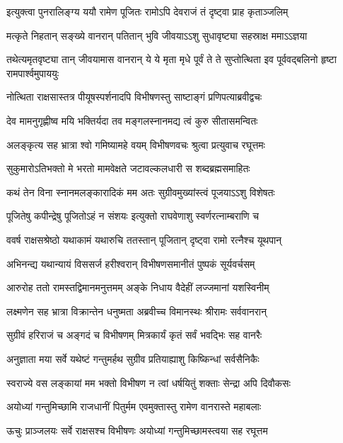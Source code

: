 \twolineshloka
{इत्युक्त्वा पुनरालिङ्ग्य ययौ रामेण पूजितः}
{रामोऽपि देवराजं तं दृष्ट्वा प्राह कृताञ्जलिम्} %

\twolineshloka
{मत्कृते निहतान् सङ्ख्ये वानरान् पतितान् भुवि}
{जीवयाऽऽशु सुधावृष्ट्या सहस्राक्ष ममाऽऽज्ञया} %

\threelineshloka
{तथेत्यमृतवृष्ट्या तान् जीवयामास वानरान्}
{ये ये मृता मृधे पूर्वं ते ते सुप्तोत्थिता इव}
{पूर्ववद्बलिनो हृष्टा रामपार्श्वमुपाययुः} %

\twolineshloka
{नोत्थिता राक्षसास्तत्र पीयूषस्पर्शनादपि}
{विभीषणस्तु साष्टाङ्गं प्रणिपत्याब्रवीद्वचः} %

\twolineshloka
{देव मामनुगृह्णीष्व मयि भक्तिर्यदा तव}
{मङ्गलस्नानमद्य त्वं कुरु सीतासमन्वितः} %

\twolineshloka
{अलङ्कृत्य सह भ्रात्रा श्वो गमिष्यामहे वयम्}
{विभीषणवचः श्रुत्वा प्रत्युवाच रघूत्तमः} %

\twolineshloka
{सुकुमारोऽतिभक्तो मे भरतो मामवेक्षते}
{जटावल्कलधारी स शब्दब्रह्मसमाहितः} %

\twolineshloka
{कथं तेन विना स्नानमलङ्कारादिकं मम}
{अतः सुग्रीवमुख्यांस्त्वं पूजयाऽऽशु विशेषतः} %

\twolineshloka
{पूजितेषु कपीन्द्रेषु पूजितोऽहं न संशयः}
{इत्युक्तो राघवेणाशु स्वर्णरत्नाम्बराणि च} %

\twolineshloka
{ववर्ष राक्षसश्रेष्ठो यथाकामं यथारुचि}
{ततस्तान् पूजितान् दृष्ट्वा रामो रत्नैश्च यूथपान्} %

\twolineshloka
{अभिनन्द्य यथान्यायं विससर्ज हरीश्वरान्}
{विभीषणसमानीतं पुष्पकं सूर्यवर्चसम्} %

\twolineshloka
{आरुरोह ततो रामस्तद्विमानमनुत्तमम्}
{अङ्के निधाय वैदेहीं लज्जमानां यशस्विनीम्} %

\twolineshloka
{लक्ष्मणेन सह भ्रात्रा विक्रान्तेन धनुष्मता}
{अब्रवीच्च विमानस्थः श्रीरामः सर्ववानरान्} %

\twolineshloka
{सुग्रीवं हरिराजं च अङ्गदं च विभीषणम्}
{मित्रकार्यं कृतं सर्वं भवद्भिः सह वानरैः} %

\twolineshloka
{अनुज्ञाता मया सर्वे यथेष्टं गन्तुमर्हथ}
{सुग्रीव प्रतियाह्याशु किष्किन्धां सर्वसैनिकैः} %

\twolineshloka
{स्वराज्ये वस लङ्कायां मम भक्तो विभीषण}
{न त्वां धर्षयितुं शक्ताः सेन्द्रा अपि दिवौकसः} %

\twolineshloka
{अयोध्यां गन्तुमिच्छामि राजधानीं पितुर्मम}
{एवमुक्तास्तु रामेण वानरास्ते महाबलाः} %

\twolineshloka
{ऊचुः प्राञ्जलयः सर्वे राक्षसश्च विभीषणः}
{अयोध्यां गन्तुमिच्छामस्त्वया सह रघूत्तम} %

